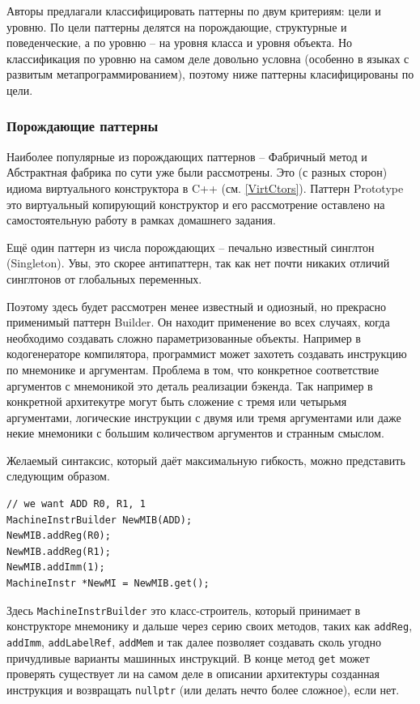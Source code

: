 \documentclass[a4paper,12pt,oneside]{article}
\begin{document}
Авторы предлагали классифицировать паттерны по двум критериям: цели и уровню. По цели паттерны делятся на порождающие, структурные и поведенческие, а по уровню -- на уровня класса и уровня объекта. Но классификация по уровню на самом деле довольно условна (особенно в языках с развитым метапрограммированием), поэтому ниже паттерны класифицированы по цели.

\subsubsection{Порождающие паттерны}

Наиболее популярные из порождающих паттернов -- Фабричный метод и Абстрактная фабрика по сути уже были рассмотрены. Это (с разных сторон) идиома виртуального конструктора в C++ (см. \ref{VirtCtors}). Паттерн Prototype это виртуальный копирующий конструктор и его рассмотрение оставлено на самостоятельную работу в рамках домашнего задания.

Ещё один паттерн из числа порождающих -- печально известный синглтон (Singleton). Увы, это скорее антипаттерн, так как нет почти никаких отличий синглтонов от глобальных переменных.

Поэтому здесь будет рассмотрен менее известный и одиозный, но прекрасно применимый паттерн Builder. Он находит применение во всех случаях, когда необходимо создавать сложно параметризованные объекты. Например в кодогенераторе компилятора, программист может захотеть создавать инструкцию по мнемонике и аргументам. Проблема в том, что конкретное соответствие аргументов с мнемоникой это деталь реализации бэкенда. Так например в конкретной архитекутре могут быть сложение с тремя или четырьмя аргументами, логические инструкции с двумя или тремя аргументами или даже некие мнемоники с большим количеством аргументов и странным смыслом.

Желаемый синтаксис, который даёт максимальную гибкость, можно представить следующим образом.

\begin{lstlisting}
// we want ADD R0, R1, 1
MachineInstrBuilder NewMIB(ADD);
NewMIB.addReg(R0);
NewMIB.addReg(R1);
NewMIB.addImm(1);
MachineInstr *NewMI = NewMIB.get();
\end{lstlisting}

Здесь \lstinline!MachineInstrBuilder! это класс-строитель, который принимает в конструкторе мнемонику и дальше через серию своих методов, таких как \lstinline!addReg!, \lstinline!addImm!, \lstinline!addLabelRef!, \lstinline!addMem! и так далее позволяет создавать сколь угодно причудливые варианты машинных инструкций. В конце метод \lstinline!get! может проверять существует ли на самом деле в описании архитектуры созданная инструкция и возвращать \lstinline!nullptr! (или делать нечто более сложное), если нет.
\end{document}
